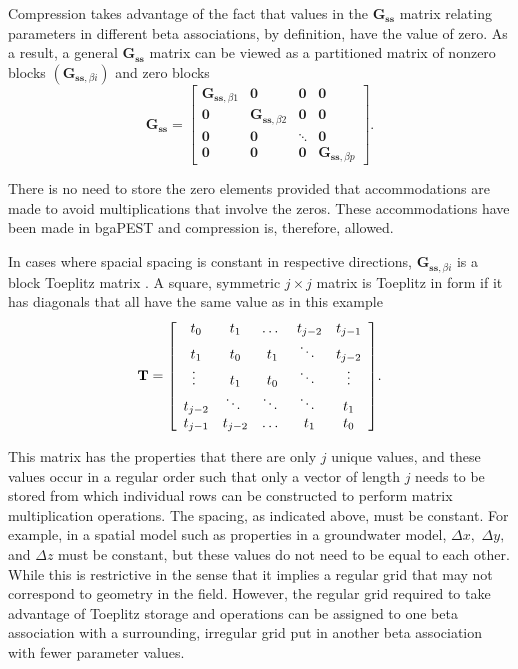 \documentclass[11pt,oneside,onecolumn]{usgsreport}
\begin{document}
\begin{appendix}
\begin{bibunit}
Compression takes advantage of the fact that values in the $\mathbf{G_{ss}}$
matrix relating parameters in different beta associations, by definition,
have the value of zero. As a result, a general $\mathbf{G_{ss}}$
matrix can be viewed as a partitioned matrix of nonzero blocks $\left(\mathbf{G}_{\mathbf{ss},\beta i}\right)$
and zero blocks
\[
\mathbf{G}_{\mathbf{ss}}=\left[\begin{array}{cccc}
\mathbf{G}_{\mathbf{ss},\beta1} & \mathbf{0} & \mathbf{0} & \mathbf{0}\\
\mathbf{0} & \mathbf{G}_{\mathbf{ss},\beta2} & \mathbf{0} & \mathbf{0}\\
\mathbf{0} & \mathbf{0} & \ddots & \mathbf{0}\\
\mathbf{0} & \mathbf{0} & \mathbf{0} & \mathbf{G}_{\mathbf{ss},\beta p}
\end{array}\right].
\]


There is no need to store the zero elements provided that accommodations
are made to avoid multiplications that involve the zeros. These accommodations
have been made in bgaPEST and compression is, therefore, allowed.

In cases where spacial spacing is constant in respective directions,
$\mathbf{G}_{\mathbf{ss},\beta i}$ is a block Toeplitz matrix \citep{toeplitz}.
A square, symmetric $j\times j$ matrix is Toeplitz in form if it
has diagonals that all have the same value as in this example
\[
\mathbf{T}=\text{\ensuremath{\left[\begin{array}{ccccc}
 t_{0}  &  t_{1}  &  \dots\  &  t_{j-2}  &  t_{j-1}\\
t_{1}  &  t_{0}  &  t_{1}  &  \ddots\  &  t_{j-2}\\
\vdots\  &  t_{1}  &  t_{0}  &  \ddots\  &  \vdots\\
t_{j-2}  &  \ddots\  &  \ddots\  &  \ddots\  &  t_{1}\\
t_{j-1}  &  t_{j-2}  &  \dots\  &  t_{1}  &  t_{0} 
\end{array}\right]}}.
\]


This matrix has the properties that there are only $j$ unique values,
and these values occur in a regular order such that only a vector
of length $j$ needs to be stored from which individual rows can be
constructed to perform matrix multiplication operations. The spacing,
as indicated above, must be constant. For example, in a spatial model
such as properties in a groundwater model, $\Delta x,$ $\Delta y,$
and $\Delta z$ must be constant, but these values do not need to
be equal to each other. While this is restrictive in the sense that
it implies a regular grid that may not correspond to geometry in the
field. However, the regular grid required to take advantage of Toeplitz
storage and operations can be assigned to one beta association with
a surrounding, irregular grid put in another beta association with
fewer parameter values.


\end{bibunit}
\end{appendix}
\end{document}
